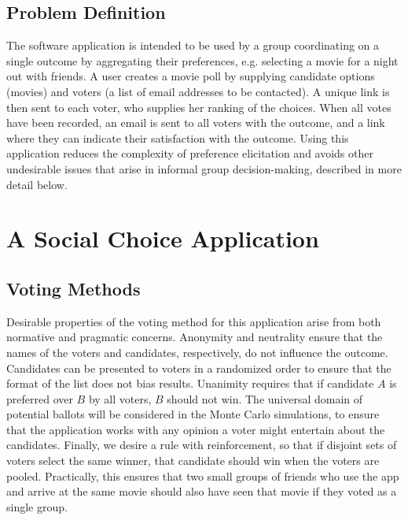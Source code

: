 \documentclass[12pt,letterpaper]{article} %
\begin{document}
\subsection{Problem Definition} 


The software application is intended to be used by a group coordinating on a single outcome by aggregating their preferences, e.g. selecting a movie for a night out with friends. A user creates a movie poll by supplying candidate options (movies) and voters (a list of email addresses to be contacted). A unique link is then sent to each voter, who supplies her ranking of the choices. When all votes have been recorded, an email is sent to all voters with the outcome, and a link where they can indicate their satisfaction with the outcome. Using this application reduces the complexity of preference elicitation and avoids other undesirable issues that arise in informal group decision-making, described in more detail below.


\section{A Social Choice Application}

\subsection{Voting Methods}

Desirable properties of the voting method for this application arise from both normative and pragmatic concerns. Anonymity and neutrality ensure that the names of the voters and candidates, respectively, do not influence the outcome. Candidates can be presented to voters in a randomized order to ensure that the format of the list does not bias results. Unanimity requires that if candidate $A$ is preferred over $B$ by all voters, $B$ should not win. The universal domain of potential ballots will be considered in the Monte Carlo simulations, to ensure that the application works with any opinion a voter might entertain about the candidates. Finally, we desire a rule with reinforcement, so that if disjoint sets of voters select the same winner, that candidate should win when the voters are pooled. Practically, this ensures that two small groups of friends who use the app and arrive at the same movie should also have seen that movie if they voted as a single group.
\end{document}
